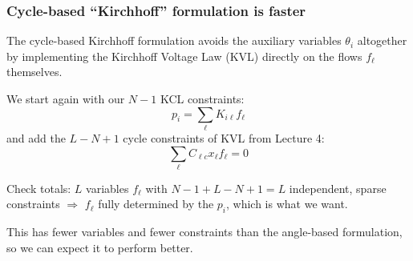 \documentclass[10pt,aspectratio=169,dvipsnames]{beamer}
\begin{document}
\begin{frame}
  \frametitle{Cycle-based ``Kirchhoff'' formulation is faster}

  The cycle-based \alert{Kirchhoff formulation} avoids the auxiliary variables $\theta_i$ altogether by implementing the Kirchhoff Voltage Law (KVL) directly on the flows $f_\ell$ themselves.

  We start again with our $N-1$ KCL constraints:
  \begin{equation*}
    p_i = \sum_{\ell} K_{i\ell}f_\ell
  \end{equation*}
  and add the $L-N+1$ cycle constraints of KVL from Lecture 4:
  \begin{equation*}
    \sum_\ell C_{\ell c} x_\ell f_\ell = 0
  \end{equation*}

  Check totals: $L$ variables $f_\ell$ with $N-1 + L-N+1 = L$  independent, sparse constraints $\Rightarrow$ $f_\ell$ fully determined by the $p_i$, which is what we want.

  This has fewer variables and fewer constraints than the angle-based formulation, so we can expect it to perform better.
\end{frame}
\end{document}
